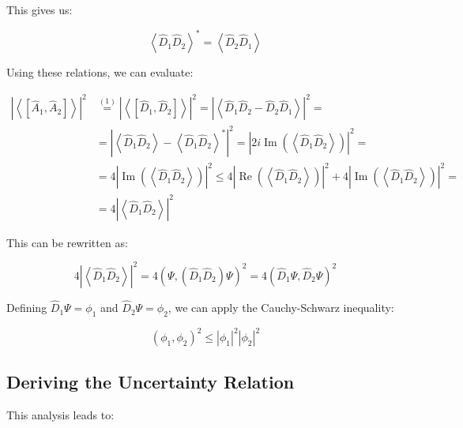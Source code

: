 \documentclass[italian]{HKNdocument}
\begin{document}
This gives us:

\begin{equation}
\left\langle\hat{D}_{1} \hat{D}_{2}\right\rangle^{*}=\left\langle\hat{D}_{2} \hat{D}_{1}\right\rangle \label{eq:7.11}
\end{equation}

Using these relations, we can evaluate:

\begin{align}
\left|\left\langle\left[\hat{A}_{1}, \hat{A}_{2}\right]\right\rangle\right|^{2} & \stackrel{(1)}{=}\left|\left\langle\left[\hat{D}_{1}, \hat{D}_{2}\right]\right\rangle\right|^{2}=\left|\left\langle\hat{D}_{1} \hat{D}_{2}-\hat{D}_{2} \hat{D}_{1}\right\rangle\right|^{2}= \\
& =\left|\left\langle\hat{D}_{1} \hat{D}_{2}\right\rangle-\left\langle\hat{D}_{1} \hat{D}_{2}\right\rangle^{*}\right|^{2}=\left|2 i \operatorname{Im}\left(\left\langle\hat{D}_{1} \hat{D}_{2}\right\rangle\right)\right|^{2}= \\
& =4\left|\operatorname{Im}\left(\left\langle\hat{D}_{1} \hat{D}_{2}\right\rangle\right)\right|^{2} \leq 4\left|\operatorname{Re}\left(\left\langle\hat{D}_{1} \hat{D}_{2}\right\rangle\right)\right|^{2}+4\left|\operatorname{Im}\left(\left\langle\hat{D}_{1} \hat{D}_{2}\right\rangle\right)\right|^{2}= \\
& =4\left|\left\langle\hat{D}_{1} \hat{D}_{2}\right\rangle\right|^{2} \label{eq:7.12}
\end{align}

This can be rewritten as:

\begin{equation}
4\left|\left\langle\hat{D}_{1} \hat{D}_{2}\right\rangle\right|^{2}=4\left(\Psi,\left(\hat{D}_{1} \hat{D}_{2}\right) \Psi\right)^{2}=4\left(\hat{D}_{1} \Psi, \hat{D}_{2} \Psi\right)^{2} \label{eq:7.13}
\end{equation}

Defining $\hat{D}_{1} \Psi=\phi_{1}$ and $\hat{D}_{2} \Psi=\phi_{2}$, we can apply the Cauchy-Schwarz inequality:

\begin{equation}
\left(\phi_{1}, \phi_{2}\right)^{2} \leq\left|\phi_{1}\right|^2\left|\phi_{2}\right|^2 \label{eq:7.14}
\end{equation}


\subsection{Deriving the Uncertainty Relation}
This analysis leads to:
\end{document}
